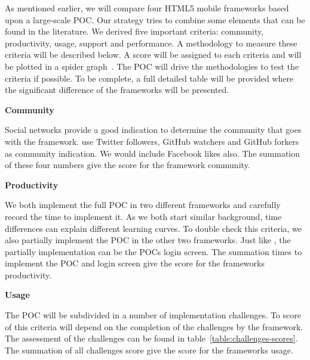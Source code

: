 \documentclass[a4paper]{artikel3}
\renewcommand{\paragraph}[1]{{\bf #1} }
\begin{document}
As mentioned earlier,  we will compare four HTML5 mobile frameworks based upon a large-scale POC.  Our strategy tries to combine some elements that can be found in the literature.  We derived five important criteria:  community,  productivity,  usage,  support and performance.  A methodology to measure these criteria will be described below.  A score will be assigned to each criteria and will be plotted in a spider graph~\cite{Few2005}.   The POC will drive the methodologies to test the criteria if possible.  To be complete,  a full detailed table will be provided where the significant difference of the frameworks will be presented. 	


\paragraph{Community}%

Social networks provide a good indication to determine the community that goes with the framework.  \cite{Sarrafi2012a,Ayuso2012} use Twitter followers,  GitHub watchers and GitHub forkers as community indication.  We would include Facebook likes also.  The summation of these four numbers give the score for the framework community.  


\paragraph{Productivity}%

We both implement the full POC in two different frameworks and carefully record the time to implement it.  As we both start similar background,  time differences can explain different learning curves.  To double check this criteria,  we also partially implement the POC in the other two frameworks.  Just like \cite{Burris},  the partially implementation can be the POCs login screen.  The summation times to implement the POC and login screen give the score for the frameworks productivity.  

\paragraph{Usage}%

The POC will be subdivided in a number of implementation challenges.  To score of this criteria will depend on the completion of the challenges by the framework.  The assessment of the challenges can be found in table~\ref{table:challenges-scores}.  The summation of all challenges score give the score for the frameworks usage.
\end{document}
